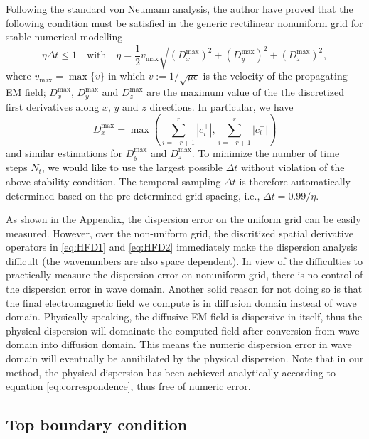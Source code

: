 \documentclass[a4paper,10pt]{article}
\begin{document}
Following the standard von Neumann analysis, the author have proved \citep{Yang_2023_HFDNU} that the following condition must be satisfied in the generic rectilinear nonuniform grid for stable numerical modelling
\begin{equation}
 \eta\Delta t\leq 1 \quad\text{with} \quad
  \eta=\frac{1}{2} v_{\max}\sqrt{(D_x^{\max})^2 + (D_y^{\max})^2 + (D_z^{\max})^2},
\end{equation}
where $v_{\max}=\max\{v\}$ in which $v:=1/\sqrt{\mu\epsilon}$ is the velocity of the propagating EM field; $D_x^{\max}$, $D_y^{\max}$ and $D_z^{\max}$ are the maximum value of the the discretized first derivatives along $x$, $y$ and $z$ directions. In particular, we have
\begin{equation}
  D_x^{\max}  = \max(\sum_{i=-r+1}^r |c_i^+|,\sum_{i=-r+1}^r |c_i^-|)
\end{equation}
and similar estimations for $D_y^{\max}$ and $D_z^{\max}$. To minimize the number of time steps $N_t$, we would like to use the largest possible $\Delta t$ without violation of the above stability condition. The temporal sampling $\Delta t$ is therefore automatically determined based on the pre-determined grid spacing, i.e., $\Delta t=0.99/\eta$.

As shown in the Appendix, the dispersion error on the uniform grid can be easily measured. However, over the non-uniform grid, the discritized spatial derivative operators in \eqref{eq:HFD1} and \eqref{eq:HFD2} immediately make the dispersion analysis difficult (the wavenumbers are also space dependent). In view of the difficulties to practically measure the dispersion error on nonuniform grid, there is no control of the dispersion error in wave domain. Another solid reason for not doing so is that the final electromagnetic field we compute is in diffusion domain instead of wave domain. Physically speaking, the diffusive EM field is dispersive in itself, thus the physical dispersion will domainate the computed field after conversion from wave domain into diffusion domain. This means the numeric dispersion error in wave domain will eventually be annihilated by the physical dispersion. Note that  in our method, the physical dispersion has been achieved analytically according to equation \eqref{eq:correspondence}, thus free of numeric error.


\subsection{Top boundary condition}
\end{document}
